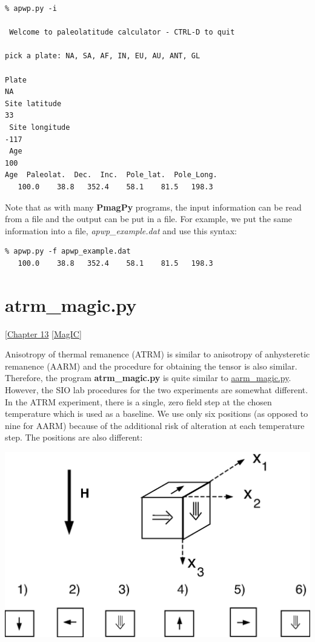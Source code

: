 \documentclass[11pt]{book}
\begin{document}
{{{{\begin{verbatim}
% apwp.py -i

 Welcome to paleolatitude calculator - CTRL-D to quit

pick a plate: NA, SA, AF, IN, EU, AU, ANT, GL 

Plate
NA
Site latitude
33
 Site longitude
-117
 Age
100
Age  Paleolat.  Dec.  Inc.  Pole_lat.  Pole_Long.
   100.0    38.8   352.4    58.1    81.5   198.3

\end{verbatim}

Note that as with many {\bf PmagPy}  programs, the input information can be read from a file and the output can be put in a file.   For example, we put the same information into a file, {\it apwp\_example.dat} and use this syntax:

\begin{verbatim}
% apwp.py -f apwp_example.dat
   100.0    38.8   352.4    58.1    81.5   198.3
\end{verbatim}

\section {\bf atrm\_magic.py}
{ [\href{http://magician.ucsd.edu/Essentials/WebBook2.html#Paleomagnetic_tensors}{Chapter 13} 
\href{#MagIC}{[MagIC]}
\label{ex:atrm_magic}

Anisotropy of thermal  remanence (ATRM) is similar to anisotropy of anhysteretic remanence (AARM) and the procedure for obtaining the tensor is also similar.  Therefore, the program {\bf atrm\_magic.py} is quite similar to \href{#aarm_magic.py}{aarm\_magic.py}.  However, the SIO lab procedures for the two experiments are somewhat different.  In the ATRM experiment, there is a single, zero field step at the chosen temperature which is used as a baseline.  We use only six positions (as opposed to nine for AARM) because of the additional risk of alteration at each temperature step.  The positions are also different:  

\includegraphics[width=12 cm]{EPSfiles/atrm_meas.eps}

}}}}}
\end{document}
